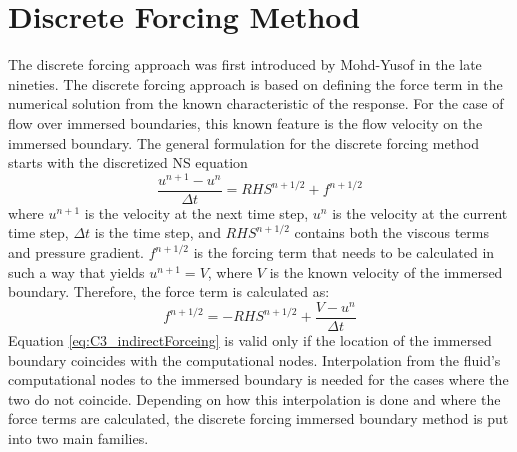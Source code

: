 \section{Discrete Forcing Method}
The discrete forcing approach was first introduced by Mohd-Yusof \cite{mohd1997combined} in the late nineties. The discrete forcing approach is based on defining the force term in the numerical solution from the known characteristic of the response. For the case of flow over immersed boundaries, this known feature is the flow velocity on the immersed boundary. The general formulation for the discrete forcing method starts with the discretized NS equation
%
\begin{equation}\label{eq:C3_discreteNSforIndirectForcing}
    \frac{u^{n+1} - u^n}{\Delta t} = RHS^{n+1/2} + f^{n+1/2}
\end{equation}
%
where $u^{n+1}$ is the velocity at the next time step, $u^n$ is the velocity at the current time step, $\Delta t$ is the time step, and $RHS^{n+1/2}$ contains both the viscous terms and pressure gradient. $f^{n+1/2}$ is the forcing term that needs to be calculated in such a way that yields $u^{n+1} = V$, where $V$ is the known velocity of the immersed boundary. Therefore, the force term is calculated as:
%
\begin{equation}\label{eq:C3_indirectForceing}
    f^{n+1/2} = -RHS^{n+1/2} + \frac{V - u^n}{\Delta t}
\end{equation}
%
Equation \eqref{eq:C3_indirectForceing} is valid only if the location of the immersed boundary coincides with the computational nodes. Interpolation from the fluid's computational nodes to the immersed boundary is needed for the cases where the two do not coincide. Depending on how this interpolation is done and where the force terms are calculated, the discrete forcing immersed boundary method is put into two main families.

